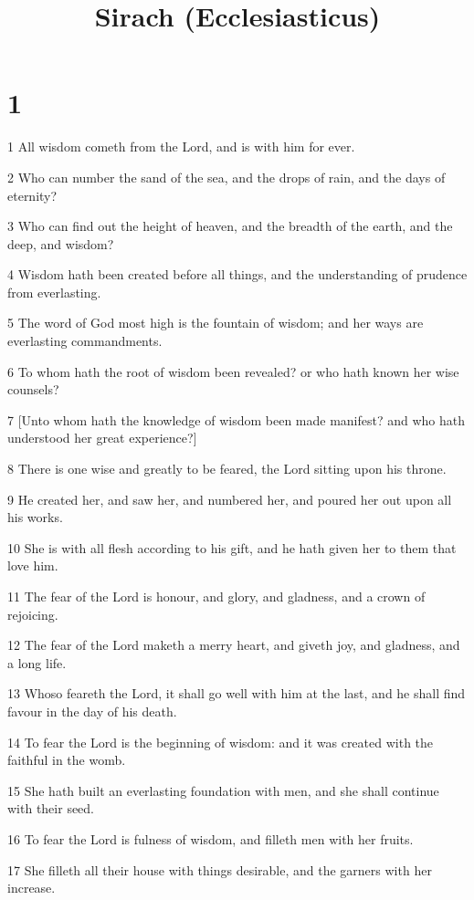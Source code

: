 

\title{Sirach (Ecclesiasticus)}


\chapter{1}

\par 1 All wisdom cometh from the Lord, and is with him for ever.
\par 2 Who can number the sand of the sea, and the drops of rain, and the days of eternity?
\par 3 Who can find out the height of heaven, and the breadth of the earth, and the deep, and wisdom?
\par 4 Wisdom hath been created before all things, and the understanding of prudence from everlasting.
\par 5 The word of God most high is the fountain of wisdom; and her ways are everlasting commandments.
\par 6 To whom hath the root of wisdom been revealed? or who hath known her wise counsels?
\par 7 [Unto whom hath the knowledge of wisdom been made manifest? and who hath understood her great experience?]
\par 8 There is one wise and greatly to be feared, the Lord sitting upon his throne.
\par 9 He created her, and saw her, and numbered her, and poured her out upon all his works.
\par 10 She is with all flesh according to his gift, and he hath given her to them that love him.
\par 11 The fear of the Lord is honour, and glory, and gladness, and a crown of rejoicing.
\par 12 The fear of the Lord maketh a merry heart, and giveth joy, and gladness, and a long life.
\par 13 Whoso feareth the Lord, it shall go well with him at the last, and he shall find favour in the day of his death.
\par 14 To fear the Lord is the beginning of wisdom: and it was created with the faithful in the womb.
\par 15 She hath built an everlasting foundation with men, and she shall continue with their seed.
\par 16 To fear the Lord is fulness of wisdom, and filleth men with her fruits.
\par 17 She filleth all their house with things desirable, and the garners with her increase.
